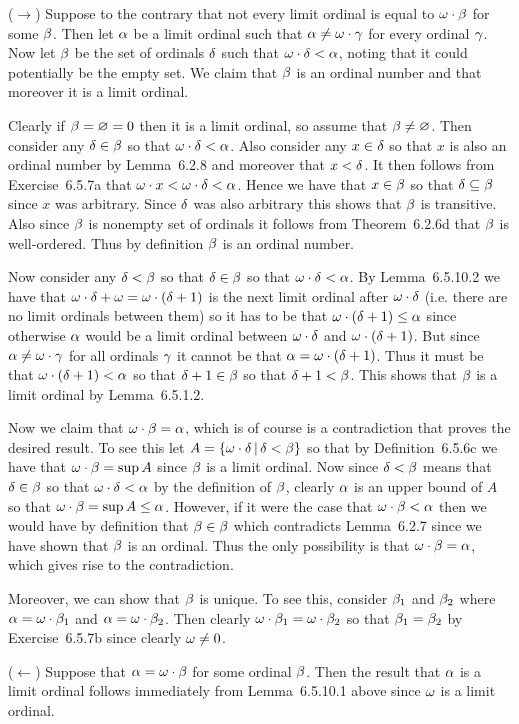 \begin{solution}
    \mainprob

	($\to$) Suppose to the contrary that not every limit ordinal is equal to $\omega \cdot \beta$ for some $\beta$.
    Then let $\alpha$ be a limit ordinal such that $\alpha \neq \omega \cdot \gamma$ for every ordinal $\gamma$.
    Now let $\beta$ be the set of ordinals $\delta$ such that $\omega \cdot \delta < \alpha$, noting that it could potentially be the empty set.
    We claim that $\beta$ is an ordinal number and that moreover it is a limit ordinal.

    Clearly if $\beta = \varnothing = 0$ then it is a limit ordinal, so assume that $\beta \neq \varnothing$.
    Then consider any $\delta \in \beta$ so that $\omega \cdot \delta < \alpha$.
    Also consider any $x \in \delta$ so that $x$ is also an ordinal number by Lemma~6.2.8 and moreover that $x < \delta$.
    It then follows from Exercise~6.5.7a that $\omega \cdot x < \omega \cdot \delta < \alpha$.
    Hence we have that $x \in \beta$ so that $\delta \subseteq \beta$ since $x$ was arbitrary.
    Since $\delta$ was also arbitrary this shows that $\beta$ is transitive.
    Also since $\beta$ is nonempty set of ordinals it follows from Theorem~6.2.6d that $\beta$ is well-ordered.
    Thus by definition $\beta$ is an ordinal number.

    Now consider any $\delta < \beta$ so that $\delta \in \beta$ so that $\omega \cdot \delta < \alpha$.
    By Lemma~6.5.10.2 we have that $\omega \cdot \delta + \omega = \omega \cdot (\delta + 1)$ is the next limit ordinal after $\omega \cdot \delta$ (i.e. there are no limit ordinals between them) so it has to be that $\omega \cdot (\delta + 1) \leq \alpha$ since otherwise $\alpha$ would be a limit ordinal between $\omega \cdot \delta$ and $\omega \cdot (\delta + 1)$.
    But since $\alpha \neq \omega \cdot \gamma$ for all ordinals $\gamma$ it cannot be that $\alpha = \omega \cdot (\delta + 1)$.
    Thus it must be that $\omega \cdot (\delta + 1) < \alpha$ so that $\delta + 1 \in \beta$ so that $\delta + 1 < \beta$.
    This shows that $\beta$ is a limit ordinal by Lemma~6.5.1.2.

    Now we claim that $\omega \cdot \beta = \alpha$, which is of course is a contradiction that proves the desired result.
    To see this let $A = \left\{ \omega \cdot \delta \,|\, \delta < \beta \right\}$ so that by Definition~6.5.6c we have that $\omega \cdot \beta = \sup{A}$ since $\beta$ is a limit ordinal.
    Now since $\delta < \beta$ means that $\delta \in \beta$ so that $\omega \cdot \delta < \alpha$ by the definition of $\beta$, clearly $\alpha$ is an upper bound of $A$ so that $\omega \cdot \beta = \sup{A} \leq \alpha$.
    However, if it were the case that $\omega \cdot \beta < \alpha$ then we would have by definition that $\beta \in \beta$ which contradicts Lemma~6.2.7 since we have shown that $\beta$ is an ordinal.
    Thus the only possibility is that $\omega \cdot \beta = \alpha$, which gives rise to the contradiction.

    Moreover, we can show that $\beta$ is unique.
    To see this, consider $\beta_1$ and $\beta_2$ where $\alpha = \omega \cdot \beta_1$ and $\alpha = \omega \cdot \beta_2$.
    Then clearly $\omega \cdot \beta_1 = \omega \cdot \beta_2$ so that $\beta_1 = \beta_2$ by Exercise~6.5.7b since clearly $\omega \neq 0$.

    ($\leftarrow$) Suppose that $\alpha = \omega \cdot \beta$ for some ordinal $\beta$.
    Then the result that $\alpha$ is a limit ordinal follows immediately from Lemma~6.5.10.1 above since $\omega$ is a limit ordinal. \qedsymbol
\end{solution}

